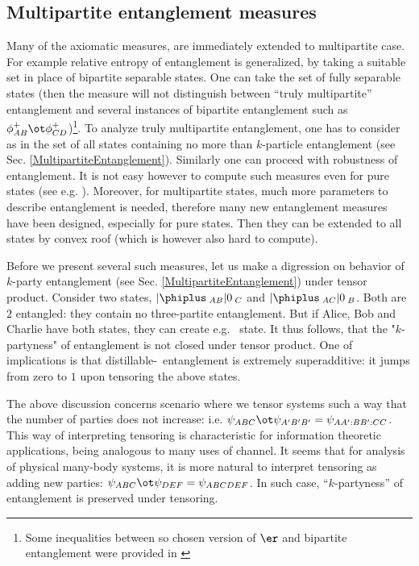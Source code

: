 \documentclass[rmp,12pt,preprint]{revtex4-2}
\begin{document}
\subsection{Multipartite entanglement measures}
\label{subsec:multipartite}
Many of the axiomatic measures, are immediately extended to multipartite case.
For example relative entropy of entanglement is generalized, by taking a suitable
set in place of bipartite separable states. One can take the set of fully separable states
(then the measure will not distinguish between ``truly multipartite''
entanglement and several instances of bipartite entanglement such as $\phi^+_{AB}\ot \phi^+_{CD}$)\footnote{Some inequalities between so chosen version of $\er$
and bipartite entanglement were provided in \cite{PlenioV2001-rel-multi}}.
To analyze truly multipartite entanglement, one has to consider as
in \cite{VPRK1997} the set of all states containing no more than
$k$-particle entanglement (see Sec. \ref{MultipartiteEntanglement}). Similarly
one can proceed with robustness of entanglement. It is not easy
however to compute such measures even for pure states (see e.g.
\cite{PlenioV2001-rel-multi}). Moreover, for multipartite states,
much more parameters to describe entanglement is needed, therefore
many new entanglement measures have been designed, especially for
pure states. Then they can be extended to all states by convex roof
(which is however also hard to compute).

Before we present several such measures, let us make a digression on
behavior of  $k$-party entanglement (see Sec.
\ref{MultipartiteEntanglement}) under tensor product. Consider two
states, $|\phiplus\>_{AB}|0\>_C$ and $|\phiplus\>_{AC}|0\>_B$. Both are $2$
entangled: they contain no three-partite entanglement. But if Alice,
Bob and Charlie have both states,  they can create e.g. \ghz\ state.
It thus follows, that the "$k$-partyness" of entanglement is not closed under tensor
product. One of  implications is that distillable-\ghz\ entanglement
is extremely  superadditive: it jumps from zero to $1$ upon
tensoring the above states.



The above discussion concerns scenario where we tensor systems
such a way that the
number of parties does not increase: i.e. $\psi_{ABC}\ot \psi_{A'B'B'}=\psi_{AA':BB':CC}$.
This way of interpreting tensoring is characteristic for information theoretic
applications, being analogous to many uses of channel. It seems that
for analysis of physical many-body systems, it is more natural
to interpret tensoring as adding new parties: $\psi_{ABC}\ot \psi_{DEF}=\psi_{ABCDEF}$.
In such case, ``$k$-partyness'' of entanglement is preserved under tensoring.
\end{document}
